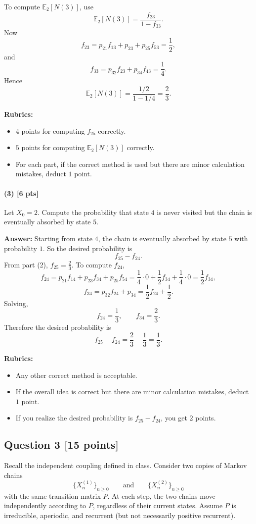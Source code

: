 \documentclass[11pt]{article}
\theoremstyle{definition}
\begin{document}
To compute \(\mathbb E_2[N(3)]\), use
\[
\mathbb E_2[N(3)] = \frac{f_{23}}{1-f_{33}}.
\]
Now
\[
f_{23}=p_{21}f_{13}+p_{23}+p_{25}f_{53}=\frac12,
\]
and
\[
f_{33}=p_{32}f_{23}+p_{34}f_{43}=\frac14.
\]
Hence
\[
\mathbb E_2[N(3)]
=
\frac{1/2}{1-1/4}
=
\frac23.
\]

\textbf{Rubrics:}
\begin{itemize}[leftmargin=2em]
    \item \(4\) points for computing \(f_{25}\) correctly.
    \item \(5\) points for computing \(\mathbb E_2[N(3)]\) correctly.
    \item For each part, if the correct method is used but there are minor calculation mistakes, deduct \(1\) point.
\end{itemize}

\paragraph{(3) \hfill [6 pts]}
Let \(X_0=2\). Compute the probability that state \(4\) is never visited but the chain is eventually absorbed by state \(5\).

\textbf{Answer:}
Starting from state \(4\), the chain is eventually absorbed by state \(5\) with probability \(1\). So the desired probability is
\[
f_{25}-f_{24}.
\]
From part (2), \(f_{25}=\frac23\). To compute \(f_{24}\),
\[
f_{24}=p_{21}f_{14}+p_{23}f_{34}+p_{25}f_{54}
=\frac14\cdot 0+\frac12 f_{34}+\frac14\cdot 0
=\frac12 f_{34},
\]
\[
f_{34}=p_{32}f_{24}+p_{34}
=\frac12 f_{24}+\frac12.
\]
Solving,
\[
f_{24}=\frac13,
\qquad
f_{34}=\frac23.
\]
Therefore the desired probability is
\[
f_{25}-f_{24}=\frac23-\frac13=\frac13.
\]

\textbf{Rubrics:}
\begin{itemize}[leftmargin=2em]
    \item Any other correct method is acceptable.
    \item If the overall idea is correct but there are minor calculation mistakes, deduct \(1\) point.
    \item If you realize the desired probability is \(f_{25}-f_{24}\), you get \(2\) points.
\end{itemize}

\subsection*{Question 3 \hfill [15 points]}

Recall the independent coupling defined in class. Consider two copies of Markov chains
\[
\{X_n^{(1)}\}_{n\ge 0}
\qquad \text{and} \qquad
\{X_n^{(2)}\}_{n\ge 0}
\]
with the same transition matrix \(P\). At each step, the two chains move independently according to \(P\), regardless of their current states. Assume \(P\) is irreducible, aperiodic, and recurrent (but not necessarily positive recurrent).
\end{document}
